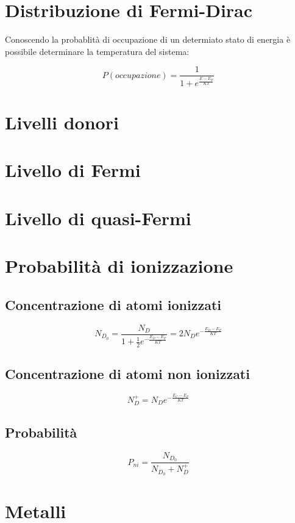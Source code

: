 \documentclass[10pt,a4paper]{report}
\begin{document}
\chapter{Distribuzione di Fermi-Dirac}

	Conoscendo la probablità di occupazione di un determiato stato di energia è possibile determinare la temperatura del sistema:

	\[
	P(occupazione)= \frac {1} { 1 + e^ { \frac{E-E_F} {KT} }}
	\]

\chapter{Livelli donori}

\chapter{Livello di Fermi}

\chapter{Livello di quasi-Fermi}

\chapter{Probabilità di ionizzazione}

 	\section{Concentrazione di atomi ionizzati}

 	\[
 	N_{D_0} = \frac {N_D} { 1+ \frac {1} {2} e^ {-\frac {E_D-E_F} {KT} } } = 2N_De^{-\frac{E_D-E_F}{KT}}
 	\]

 	\section{Concentrazione di atomi non ionizzati}

 	\[
 	N_D^+= N_De^{-\frac{E_C-E_F}{KT}}
 	\]

 	\section{Probabilità}

 	\[
 	P_{ni}=\frac{N_{D_0}}{N_{D_0}+N_D^+}
 	\]

\chapter{Metalli}
\end{document}
